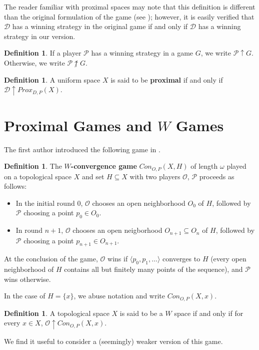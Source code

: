 \documentclass{amsart}
\theoremstyle{definition}
\newtheorem{defn}[thm]{Definition}
\theoremstyle{remark}
\newcommand{\<}{\langle}
\renewcommand{\>}{\rangle}
\newcommand{\proxgame}[1]{Prox_{D,P}(#1)}
\newcommand{\congame}[2]{Con_{O,P}(#1,#2)}
\newcommand{\pl}[1]{\mathscr{#1}}
\newcommand{\win}{\uparrow}
\begin{document}
The reader familiar with proximal spaces may note that this definition is different than the original formulation of the game (see \cite{b}); however, it is easily verified that $\pl D$ has a winning strategy in the original game if and only if $\pl D$ has a winning strategy in our version.

\begin{defn}
  If a player $\pl P$ has a winning strategy in a game $G$, we write $\pl P\win G$. Otherwise, we write $\pl P\not\win G$.
\end{defn}

\begin{defn}
  A uniform space $X$ is said to be \textbf{proximal} if and only if $\pl D\win\proxgame{X}$.
\end{defn}

\section{Proximal Games and $W$ Games}

The first author introduced the following game in \cite{ginfinite}.

\begin{defn}
  The \textbf{$W$-convergence game} $\congame{X}{H}$ of length $\omega$ played on a topological space $X$ and set $H\subseteq X$ with two players $\pl O$, $\pl P$ proceeds as follows:
    \begin{itemize}
      \item In the initial round $0$, $\pl O$ chooses an open neighborhood $O_0$ of $H$, followed by $\pl P$ choosing a point $p_0\in O_0$.
      \item In round $n+1$, $\pl O$ chooses an open neigborhood $O_{n+1}\subseteq O_n$ of $H$, followed by $\pl P$ choosing a point $p_{n+1}\in O_{n+1}$.
    \end{itemize}
  At the conclusion of the game, $\pl O$ wins if $\<p_0,p_1,\dots\>$ converges to $H$ (every open neighborhood of $H$ contains all but finitely many points of the sequence), and $\pl P$ wins otherwise.

  In the case of $H=\{x\}$, we abuse notation and write $\congame{X}{x}$.
\end{defn}

\begin{defn}
  A topological space $X$ is said to be a $W$ space if and only if for every $x\in X$, $\pl O\win \congame{X}{x}$.
\end{defn}

We find it useful to consider a (seemingly) weaker version of this game.
\end{document}
